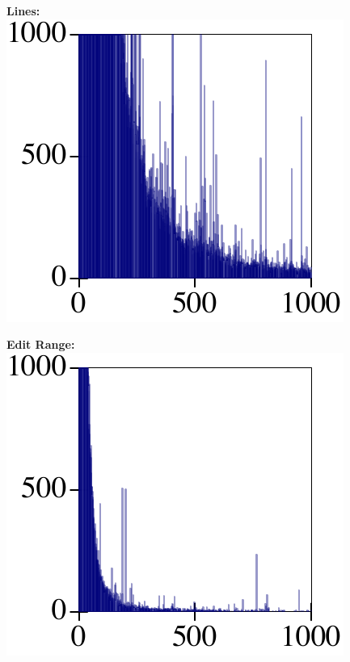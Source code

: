 \documentclass{article}
\begin{document}
\begin{minipage}{0.5\columnwidth}
  \textbf{Lines:}\\
  \includegraphics[width=\columnwidth]{out/lines-distribution.pdf}
\end{minipage}\begin{minipage}{0.5\columnwidth}
  \textbf{Edit Range:}\\
  \includegraphics[width=\columnwidth]{out/editrange-distribution.pdf}
\end{minipage}
\end{document}
